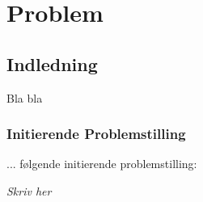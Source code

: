 \part{Problem}

\chapter{Indledning}

Bla bla

\section{Initierende Problemstilling}


... følgende initierende problemstilling:
\begin{center}
\textit{Skriv her}
\end{center}